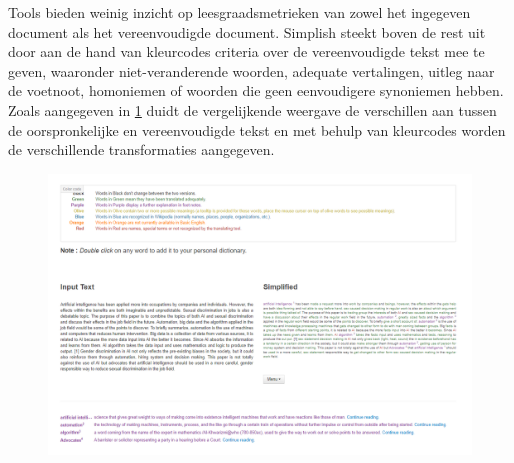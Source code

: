 \medspace

Tools bieden weinig inzicht op leesgraadsmetrieken van zowel het ingegeven document als het vereenvoudigde document. Simplish steekt boven de rest uit door aan de hand van kleurcodes criteria over de vereenvoudigde tekst mee te geven, waaronder niet-veranderende woorden, adequate vertalingen, uitleg naar de voetnoot, homoniemen of woorden die geen eenvoudigere synoniemen hebben. Zoals aangegeven in \ref{img:simplish-output} duidt de vergelijkende weergave de verschillen aan tussen de oorspronkelijke en vereenvoudigde tekst en met behulp van kleurcodes worden de verschillende transformaties aangegeven.

\begin{figure}[H]
	\includegraphics[width=\linewidth]{img/simplish-output.png}
	\label{img:simplish-output}
\end{figure}


